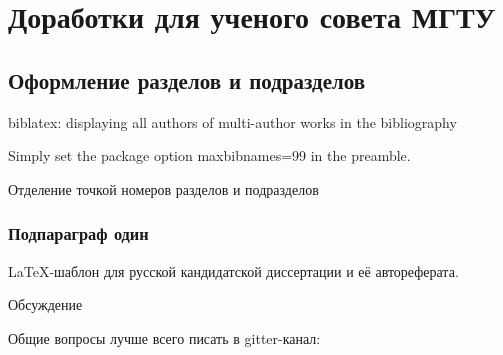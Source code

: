 \chapter{Доработки для ученого совета МГТУ}\label{ch:ch4}

\section{Оформление разделов и подразделов}\label{sec:ch4/sect1}


biblatex: displaying all authors of multi-author works in the bibliography


Simply set the package option maxbibnames=99 in the preamble.







Отделение точкой номеров разделов и подразделов



\subsection{Подпараграф \cyrdash{} один}\label{subsec:ch4/sect4/sub1}




LaTeX-шаблон для русской кандидатской диссертации и её автореферата.





Обсуждение

Общие вопросы лучше всего писать в gitter-канал:

